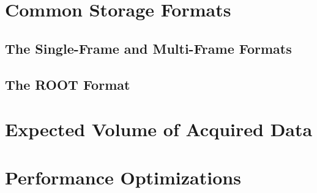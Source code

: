 \section{Common Storage Formats}

\subsection{The Single-Frame and Multi-Frame Formats}

\subsection{The ROOT Format}

\section{Expected Volume of Acquired Data}

\section{Performance Optimizations}
